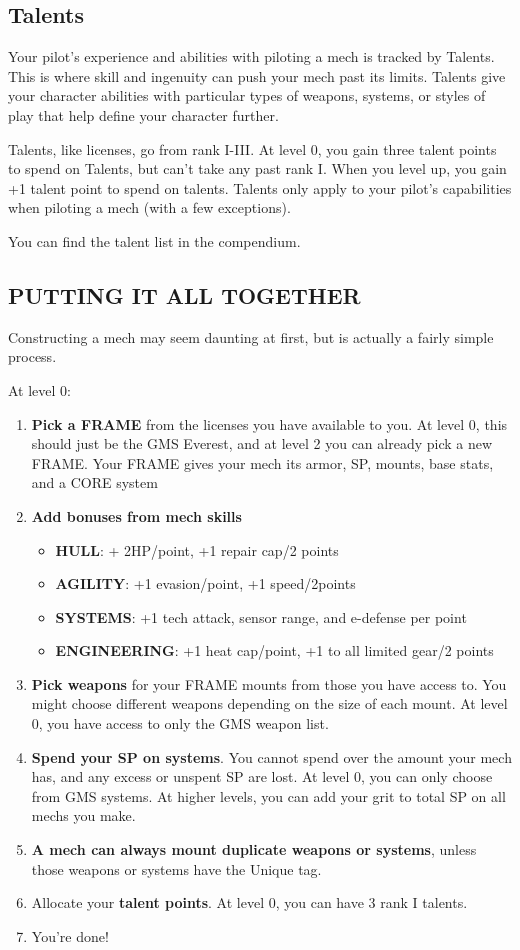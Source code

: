 \subsection{Talents}

Your pilot’s experience and abilities with piloting a mech is tracked by Talents. This is where skill and ingenuity can push your mech past its limits. Talents give your character abilities with particular types of weapons, systems, or styles of play that help define your character further. 

Talents, like licenses, go from rank I-III. At level 0, you gain three talent points to spend on Talents, but can’t take any past rank I. When you level up, you gain +1 talent point to spend on talents. Talents only apply to your pilot’s capabilities when piloting a mech (with a few exceptions). 

You can find the talent list in the compendium.

\subsection*{PUTTING IT ALL TOGETHER}

Constructing a mech may seem daunting at first, but is actually a fairly simple process.

At level 0:
\begin{enumerate}
\item \textbf{Pick a FRAME} from the licenses you have available to you. At level 0, this should just be the GMS Everest, and at level 2 you can already pick a new FRAME. Your FRAME gives your mech its armor, SP, mounts, base stats, and a CORE system
\item \textbf{Add bonuses from mech skills}
\begin{itemize}
\item \textbf{HULL}: + 2HP/point, +1 repair cap/2 points
\item \textbf{AGILITY}: +1 evasion/point, +1 speed/2points
\item \textbf{SYSTEMS}: +1 tech attack, sensor range, and e-defense per point
\item \textbf{ENGINEERING}: +1 heat cap/point, +1 to all limited gear/2 points
\end{itemize}
\item \textbf{Pick weapons} for your FRAME mounts from those you have access to. You might choose different weapons depending on the size of each mount. At level 0, you have access to only the GMS weapon list.
\item \textbf{Spend your SP on systems}. You cannot spend over the amount your mech has, and any excess or unspent SP are lost. At level 0, you can only choose from GMS systems. At higher levels, you can add your grit to total SP on all mechs you make.
\item \textbf{A mech can always mount duplicate weapons or systems}, unless those weapons or systems have the Unique tag.
\item Allocate your \textbf{talent points}. At level 0, you can have 3 rank I talents.
\item You’re done!
\end{enumerate}  


